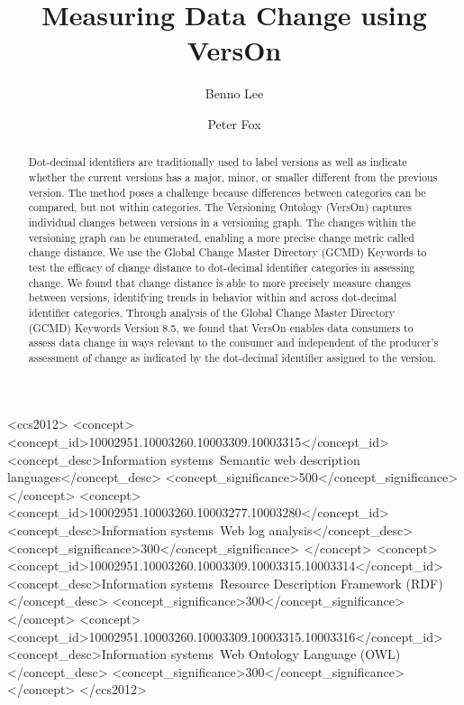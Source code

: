 \title{Measuring Data Change using VersOn}

\author{Benno Lee}
\author{Peter Fox}

\begin{abstract}
	Dot-decimal identifiers are traditionally used to label versions as well as indicate whether the current versions has a major, minor, or smaller different from the previous version.
	The method poses a challenge because differences between categories can be compared, but not within categories.
	The Versioning Ontology (VersOn) captures individual changes between versions in a versioning graph.
	The changes within the versioning graph can be enumerated, enabling a more precise change metric called change distance.
	We use the Global Change Master Directory (GCMD) Keywords to test the efficacy of change distance to dot-decimal identifier categories in assessing change.
	We found that change distance is able to more precisely measure changes between versions, identifying trends in behavior within and across dot-decimal identifier categories.
	Through analysis of the Global Change Master Directory (GCMD) Keywords Version 8.5, we found that VersOn enables data consumers to assess data change in ways relevant to the consumer and independent of the producer's assessment of change as indicated by the dot-decimal identifier assigned to the version.
\end{abstract}

\begin{CCSXML}
	<ccs2012>
	<concept>
	<concept_id>10002951.10003260.10003309.10003315</concept_id>
	<concept_desc>Information systems~Semantic web description languages</concept_desc>
	<concept_significance>500</concept_significance>
	</concept>
	<concept>
	<concept_id>10002951.10003260.10003277.10003280</concept_id>
	<concept_desc>Information systems~Web log analysis</concept_desc>
	<concept_significance>300</concept_significance>
	</concept>
	<concept>
	<concept_id>10002951.10003260.10003309.10003315.10003314</concept_id>
	<concept_desc>Information systems~Resource Description Framework (RDF)</concept_desc>
	<concept_significance>300</concept_significance>
	</concept>
	<concept>
	<concept_id>10002951.10003260.10003309.10003315.10003316</concept_id>
	<concept_desc>Information systems~Web Ontology Language (OWL)</concept_desc>
	<concept_significance>300</concept_significance>
	</concept>
	</ccs2012>
\end{CCSXML}

